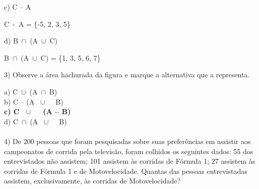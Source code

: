 \documentclass[12pt,a4paper,draft]{article}
\begin{document}
	\vspace{1cm}
	c) C – A
	\vspace{0.5cm}
	\begin{center}
		C - A = \{-5, 2, 3, 5\}
		\vspace{0.5cm}\\
		\begin{venndiagram3sets}[labelOnlyA={-1 0}, labelOnlyB={-4}, labelOnlyC={-5}, labelOnlyAB={6 7}, labelOnlyAC={-3}, labelOnlyBC={3 5}, labelABC={1}]
			\fillCNotA
		\end{venndiagram3sets}
	\end{center}
	\vspace{1cm}
	d) B $\cap$ (A $\cup$ C)
	\vspace{0.5cm}
	\begin{center}
		B $\cap$ (A $\cup$ C) = \{1, 3, 5, 6, 7\}
		\vspace{0.5cm}\\
		\begin{venndiagram3sets}[labelOnlyA={-1 0}, labelOnlyB={-4}, labelOnlyC={-5}, labelOnlyAB={6 7}, labelOnlyAC={-3}, labelOnlyBC={3 5}, labelABC={1}]
			\fillCCapB
			\fillACapB
		\end{venndiagram3sets}
	\end{center}
	\vspace{1cm}
	3) Observe a área hachurada da figura e marque a alternativa que a representa.\\
	\vspace{0.5cm}
	\begin{center}
	\end{center}
	\vspace{0.5cm}
	a) C $\cup$ (A $\cap$ B)\\
	b) C – (A  $\cup$   B)\\
	\textbf{c) C  $\cup$   (A – B)}\\
	d) C $\cap$ (A  $\cup$   B)\\
	\vspace{1cm}\\
	4) De 200 pessoas que foram pesquisadas sobre suas preferências em assistir aos campeonatos de corrida pela televisão, foram colhidos os seguintes dados: 55 dos entrevistados não assistem;	101 assistem às corridas de Fórmula 1; 27 assistem às corridas de Fórmula 1 e de Motovelocidade. Quantas das pessoas entrevistadas assistem, exclusivamente, às corridas de Motovelocidade?
\end{document}
